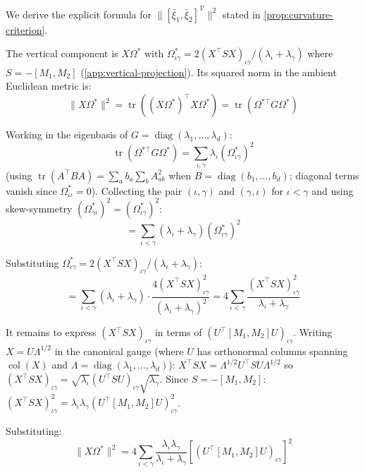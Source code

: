 \documentclass{article}
\DeclareMathOperator{\col}{col}
\DeclareMathOperator{\diag}{diag}
\DeclareMathOperator{\tr}{tr}
\theoremstyle{plain}
\theoremstyle{definition}
\theoremstyle{remark}
\begin{document}
We derive the explicit formula for $\|[\bar{\xi}_1, \bar{\xi}_2]^{\mathcal{V}}\|^2$ stated in \cref{prop:curvature-criterion}.

The vertical component is $X\Omega^*$ with $\Omega^*_{\iota\gamma} = 2(X^\top S X)_{\iota\gamma} / (\lambda_\iota + \lambda_\gamma)$ where $S = -[M_1, M_2]$ (\cref{app:vertical-projection}).
Its squared norm in the ambient Euclidean metric is:
\begin{equation}
\|X\Omega^*\|^2 = \tr((X\Omega^*)^\top X\Omega^*) = \tr(\Omega^{*\top} G \Omega^*)
\end{equation}

Working in the eigenbasis of $G = \diag(\lambda_1, \ldots, \lambda_d)$:
\begin{equation}
\tr(\Omega^{*\top} G \Omega^*) = \sum_{\iota, \gamma} \lambda_\iota (\Omega^*_{\iota\gamma})^2
\end{equation}
(using $\tr(A^\top B A) = \sum_a b_a \sum_b A_{ab}^2$ when $B = \diag(b_1, \ldots, b_d)$; diagonal terms vanish since $\Omega^*_{\iota\iota} = 0$).
Collecting the pair $(\iota, \gamma)$ and $(\gamma, \iota)$ for $\iota < \gamma$ and using skew-symmetry $(\Omega^*_{\gamma\iota})^2 = (\Omega^*_{\iota\gamma})^2$:
\begin{equation}
= \sum_{\iota < \gamma} (\lambda_\iota + \lambda_\gamma)(\Omega^*_{\iota\gamma})^2
\end{equation}

Substituting $\Omega^*_{\iota\gamma} = 2(X^\top S X)_{\iota\gamma} / (\lambda_\iota + \lambda_\gamma)$:
\begin{equation}
= \sum_{\iota < \gamma} (\lambda_\iota + \lambda_\gamma) \cdot \frac{4(X^\top S X)_{\iota\gamma}^2}{(\lambda_\iota + \lambda_\gamma)^2} = 4 \sum_{\iota < \gamma} \frac{(X^\top S X)_{\iota\gamma}^2}{\lambda_\iota + \lambda_\gamma}
\end{equation}

It remains to express $(X^\top S X)_{\iota\gamma}$ in terms of $(U^\top [M_1, M_2] U)_{\iota\gamma}$.
Writing $X = U \Lambda^{1/2}$ in the canonical gauge (where $U$ has orthonormal columns spanning $\col(X)$ and $\Lambda = \diag(\lambda_1, \ldots, \lambda_d)$):
$X^\top S X = \Lambda^{1/2} U^\top S U \Lambda^{1/2}$
so $(X^\top S X)_{\iota\gamma} = \sqrt{\lambda_\iota} (U^\top S U)_{\iota\gamma} \sqrt{\lambda_\gamma}$.
Since $S = -[M_1, M_2]$:
$(X^\top S X)_{\iota\gamma}^2 = \lambda_\iota \lambda_\gamma (U^\top [M_1, M_2] U)_{\iota\gamma}^2$.

Substituting:
\begin{equation}
\|X\Omega^*\|^2 = 4 \sum_{\iota < \gamma} \frac{\lambda_\iota \lambda_\gamma}{\lambda_\iota + \lambda_\gamma} [(U^\top [M_1, M_2] U)_{\iota\gamma}]^2
\end{equation}
\end{document}
